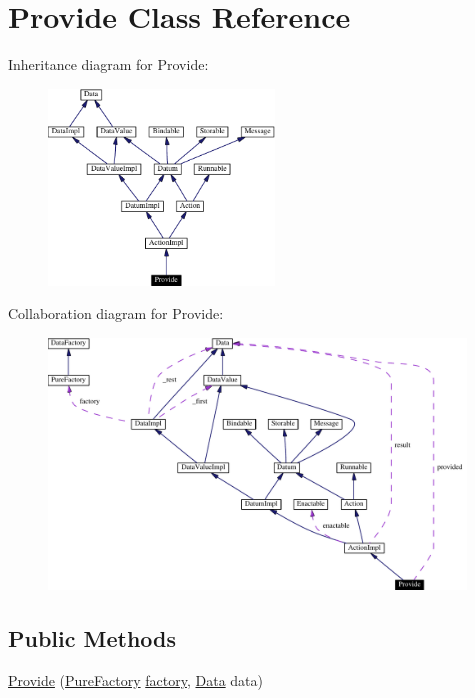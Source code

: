 \hypertarget{classProvide}{
\section{Provide  Class Reference}
\label{classProvide}
}
Inheritance diagram for Provide:\begin{figure}[H]
\begin{center}
\leavevmode
\includegraphics[width=170pt]{classProvide__inherit__graph}
\end{center}
\end{figure}
Collaboration diagram for Provide:\begin{figure}[H]
\begin{center}
\leavevmode
\includegraphics[width=314pt]{classProvide__coll__graph}
\end{center}
\end{figure}
\subsection*{Public Methods}
\begin{CompactItemize}
\item 
\hyperlink{classProvide_a0}{Provide} (\hyperlink{classPureFactory}{Pure\-Factory} \hyperlink{classDataImpl_o0}{factory}, \hyperlink{interfaceData}{Data} data)
\end{CompactItemize}
